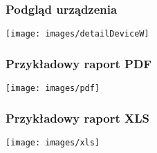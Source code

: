 \documentclass[ucs]{beamer}
\begin{document}
\begin{frame}
\frametitle{Podgląd urządzenia}
\texttt{[image: images/detailDeviceW]}
\end{frame}

\begin{frame}
\frametitle{Przykładowy raport PDF}
\begin{center}
\texttt{[image: images/pdf]}
\end{center}
\end{frame}

\begin{frame}
\frametitle{Przykładowy raport XLS}
\begin{center}
\texttt{[image: images/xls]}
\end{center}
\end{frame}
\end{document}
